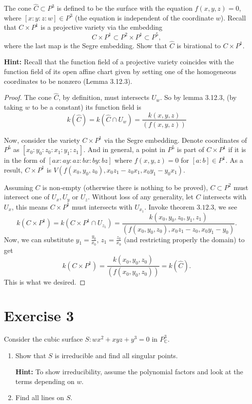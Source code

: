 \documentclass{article}
\theoremstyle{definition}
\theoremstyle{definition}
\theoremstyle{remark}
\begin{document}
The cone $\hat{C} \subset P^3$ is defined to be the surface with the equation $f(x, y, z) = 0$, where $[x : y : z : w] \in P^3$ (the equation is independent of the coordinate $w$). Recall that $C \times P^1$ is a projective variety via the embedding
\[ C \times P^1 \subset P^2 \times P^1 \subset P^5, \]
where the last map is the Segre embedding. Show that $\hat{C}$ is birational to $C \times P^1$.

\textbf{Hint:} Recall that the function field of a projective variety coincides with the function field of its open affine chart given by setting one of the homogeneous coordinates to be nonzero (Lemma 3.12.3).

\begin{proof}
	The cone $\hat{C}$, by definition, must intersects $U_w$. So by lemma 3.12.3,  (by taking $w$ to be a constant) its function field is 
	$$
	k(\hat{C}) = k(\hat{C} \cap U_w) = \frac{k(x, y, z)}{(f(x, y, z))}
	$$

	Now, consider the variety $C\times P^1$ via the Segre embedding. Denote coordinates of $P^5$ as $[x_0: y_0: z_0: x_1:y_1:z_1]$.
	And in general, a point in $P^5$ is part of $C \times P^1$ if it is in the form of $[ax: ay: az: bx: by: bz]$ where $f(x, y,z) = 0$ for $[a:b] \in P^1$.
	As a result, $C \times P^1$ is $V(f(x_0, y_0, z_0), x_0z_1 - z_0x_1, x_0y_1 - y_0x_1)$.

	Assuming $C$ is non-empty (otherwise there is nothing to be proved), $C \subset P^2$ must intersect one of $U_x, U_y$ or $U_z$. 
	Without loss of any generality, let $C$ intersects with $U_x$, this means $C \times P^1$ must intersects with $U_{x_1}$. 
	Invoke theorem $3.12.3$, we see 
	$$
		k(C \times P^1) = k(C \times P^1 \cap U_{z_1}) = \frac{k(x_0, y_0, z_0, y_1, z_1)}{(f(x_0, y_0, z_0), x_0z_1 - z_0, x_0y_1 - y_0)}.
	$$
	Now, we can substitute $y_1 = \frac{y_0}{x_0}$, $z_1 = \frac{z_0}{x_0}$ (and restricting properly the domain) to get 
	$$
		k(C \times P^1) = \frac{k(x_0, y_0, z_0)}{(f(x_0, y_0, z_0))} = k(\hat{C}).
	$$
	This is what we desired.
\end{proof}

\section*{Exercise 3}
Consider the cubic surface $S: wx^2 + xyz + y^3 = 0$ in $P^3_{\mathbb{C}}$.

\begin{enumerate}
    \item Show that $S$ is irreducible and find all singular points.
    
    \textbf{Hint:} To show irreducibility, assume the polynomial factors and look at the terms depending on $w$.
    
    \item Find all lines on $S$.
\end{enumerate}
\end{document}
